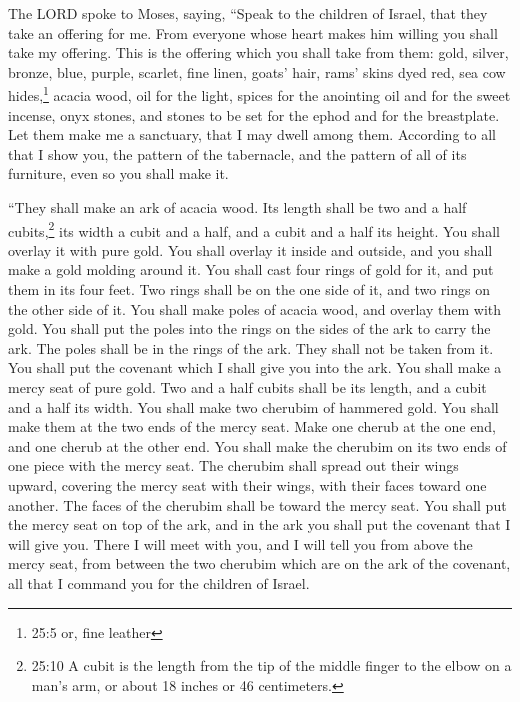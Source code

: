\mychapter{} \myverse*{}The LORD spoke to Moses, saying,
\myverse{}“Speak to the children of Israel, that they take an offering for me. From everyone
whose heart makes him willing you shall take my offering.
\myverse{}This is the offering which you shall take from them: gold, silver, bronze,
\myverse{}blue, purple, scarlet, fine linen, goats’ hair,
\myverse{}rams’ skins dyed red, sea cow hides,\footnote{25:5 or, fine leather} acacia wood,
\myverse{}oil for the light, spices for the anointing oil and for the sweet incense,
\myverse{}onyx stones, and stones to be set for the ephod and for the breastplate.
\myverse{}Let them make me a sanctuary, that I may dwell among them.
\myverse{}According to all that I show you, the pattern of the tabernacle, and the pattern
of all of its furniture, even so you shall make it.


\myverse{}“They shall make an ark of acacia wood. Its length shall be
two and a half cubits,\footnote{25:10 A cubit is the length from the tip of the middle finger to the elbow on a man’s arm, or about
	18 inches or 46 centimeters.} its width a cubit and a half, and a cubit and a half its height.
\myverse{}You shall overlay it with pure gold. You shall overlay it inside and outside,
and you shall make a gold molding around it.
\myverse{}You shall cast four rings of gold for it, and put them in its four feet.
Two rings shall be on the one side of it, and two rings on the other side of it.
\myverse{}You shall make poles of acacia wood, and overlay them with gold.
\myverse{}You shall put the poles into the rings on the sides of the ark to carry the
ark.
\myverse{}The poles shall be in the rings of the ark. They shall not be taken from
it.
\myverse{}You shall put the covenant which I shall give you into the ark.
\myverse{}You shall make a mercy seat of pure gold. Two and a half cubits shall be
its length, and a cubit and a half its width.
\myverse{}You shall make two cherubim of hammered gold. You shall make them at the
two ends of the mercy seat.
\myverse{}Make one cherub at the one end, and one cherub at the other end. You shall
make the cherubim on its two ends of one piece with the mercy seat.
\myverse{}The cherubim shall spread out their wings upward, covering the mercy seat
with their wings, with their faces toward one another. The faces of the cherubim shall be toward the mercy
seat.
\myverse{}You shall put the mercy seat on top of the ark, and in the ark you shall
put the covenant that I will give you.
\myverse{}There I will meet with you, and I will tell you from above the mercy seat,
from between the two cherubim which are on the ark of the covenant, all that I command you for the children
of Israel.


